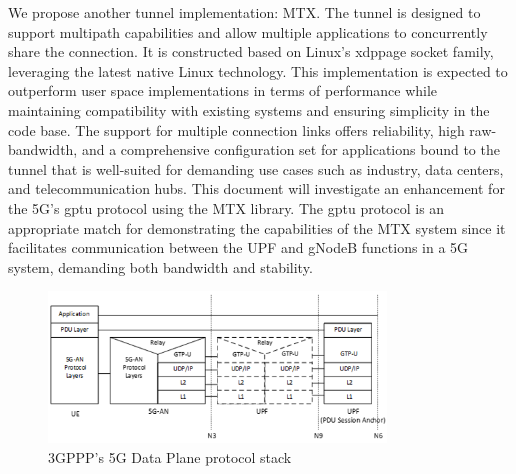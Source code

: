 %
We propose another tunnel implementation: \ac{MTX}. 
The tunnel is designed to support multipath capabilities and allow multiple applications to concurrently share the connection. 
It is constructed based on Linux's \ac{xdppage} socket family, leveraging the latest native Linux technology. 
This implementation is expected to outperform user space implementations in terms of performance while maintaining compatibility with existing systems and ensuring simplicity in the code base.
The support for multiple connection links offers reliability, high raw-bandwidth, and a comprehensive configuration set for applications bound to the tunnel that is well-suited for demanding use cases such as industry, data centers, and telecommunication hubs.
This document will investigate an enhancement for the 5G's \ac{gptu} protocol using the \ac{MTX} library. 
The \ac{gptu} protocol is an appropriate match for demonstrating the capabilities of the \ac{MTX} system since it facilitates communication between the UPF and gNodeB functions in a 5G system, demanding both bandwidth and stability.
%

\begin{figure}[H]
	\centering
	\includegraphics[width=0.8\textwidth]{resources/images/3gpp_5g_data_plane_protocol.png}
	\caption{3GPPP's 5G Data Plane protocol stack \cite{3gpp_5g_system_overview}}
    \label{fig:introduction:3gpp_5g_data_plane_protocol}
\end{figure}


